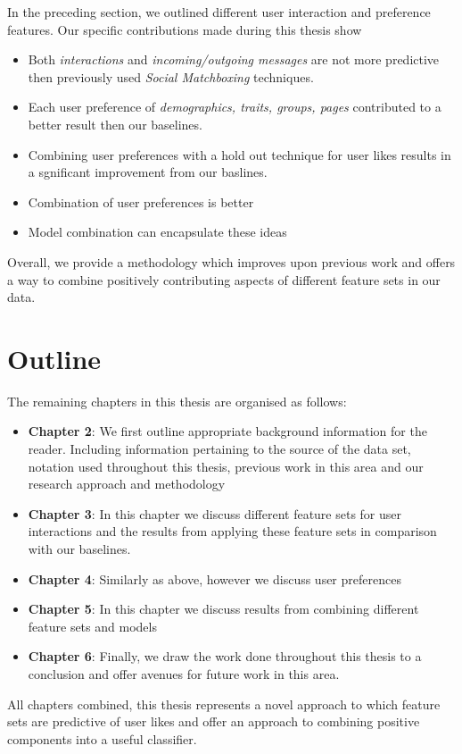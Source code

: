 In the preceding section, we outlined different user interaction and preference features. Our specific contributions made during this thesis show 

\begin{itemize}
\item Both \emph{interactions} and \emph{incoming/outgoing messages} are not more predictive then previously used \emph{Social Matchboxing} 
techniques.
\item Each user preference of \emph{demographics, traits, groups, pages} contributed to a better result then our baselines.
\item Combining user preferences with a hold out technique for user likes results in a sgnificant improvement from our baslines.
\item Combination of user preferences is better
\item Model combination can encapsulate these ideas
\end{itemize} 

Overall, we provide a methodology which improves upon previous work and offers a way to combine positively contributing aspects of different 
feature sets in our data.

\section{Outline}
\label{sec:outline}

The remaining chapters in this thesis are organised as follows:
\begin{itemize}
\item \textbf{Chapter 2}: We first outline appropriate background information for the reader. Including information pertaining to the source of 
the data set, notation used throughout this thesis, previous work in this area and our research approach and methodology
\item \textbf{Chapter 3}: In this chapter we discuss different feature sets for user interactions and the results from applying these feature sets 
in comparison with our baselines.
\item \textbf{Chapter 4}: Similarly as above, however we discuss user preferences
\item \textbf{Chapter 5}: In this chapter we discuss results from combining different feature sets and models
\item \textbf{Chapter 6}: Finally, we draw the work done throughout this thesis to a conclusion and offer avenues for future work in this area.
\end{itemize}

All chapters combined, this thesis represents a novel approach to which feature sets are predictive of user likes and offer an approach to 
combining positive components into a useful classifier.

